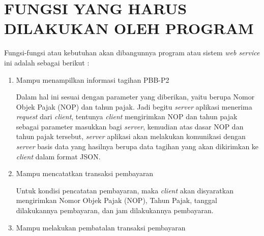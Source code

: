 \chapter{FUNGSI YANG HARUS DILAKUKAN OLEH PROGRAM}

Fungsi-fungsi atau kebutuhan akan dibangunnya program atau sistem \textit{web service} ini adalah sebagai berikut :

\begin{enumerate}[1.]
  \item Mampu menampilkan informasi tagihan PBB-P2
  
  Dalam hal ini sesuai dengan parameter yang diberikan, yaitu berupa Nomor Objek Pajak (NOP) dan tahun pajak. Jadi begitu \textit{server} aplikasi menerima \textit{request} dari \textit{client}, tentunya \textit{client} mengirimkan NOP dan tahun pajak sebagai parameter masukkan bagi \textit{server}, kemudian atas dasar NOP dan tahun pajak tersebut, \textit{server} aplikasi akan melakukan komunikasi dengan \textit{server} basis data yang hasilnya berupa data tagihan yang akan dikirimkan ke \textit{client} dalam format JSON.
  
  \item Mampu mencatatkan transaksi pembayaran
  
  Untuk kondisi pencatatan pembayaran, maka \textit{client} akan disyaratkan mengirimkan Nomor Objek Pajak (NOP), Tahun Pajak, tanggal dilakukannya pembayaran, dan jam dilakukannya pembayaran.
  
  \item Mampu melakukan pembatalan transaksi pembayaran
\end{enumerate}